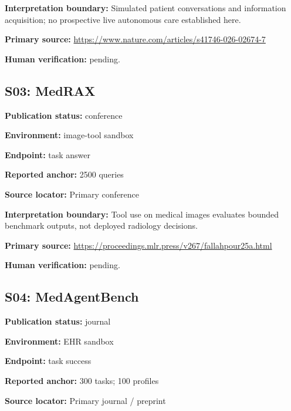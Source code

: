 \documentclass[journal,onecolumn,10pt]{IEEEtran}
\begin{document}
\noindent\textbf{Interpretation boundary:} Simulated patient conversations and information acquisition; no prospective live autonomous care established here.\par

\noindent\textbf{Primary source:} \url{https://www.nature.com/articles/s41746-026-02674-7}\par
\noindent\textbf{Human verification:} pending.

\subsection*{S03: MedRAX}

\noindent\textbf{Publication status:} conference\par

\noindent\textbf{Environment:} image-tool sandbox\par

\noindent\textbf{Endpoint:} task answer\par

\noindent\textbf{Reported anchor:} 2500 queries\par

\noindent\textbf{Source locator:} Primary conference\par

\noindent\textbf{Interpretation boundary:} Tool use on medical images evaluates bounded benchmark outputs, not deployed radiology decisions.\par

\noindent\textbf{Primary source:} \url{https://proceedings.mlr.press/v267/fallahpour25a.html}\par
\noindent\textbf{Human verification:} pending.

\subsection*{S04: MedAgentBench}

\noindent\textbf{Publication status:} journal\par

\noindent\textbf{Environment:} EHR sandbox\par

\noindent\textbf{Endpoint:} task success\par

\noindent\textbf{Reported anchor:} 300 tasks; 100 profiles\par

\noindent\textbf{Source locator:} Primary journal / preprint\par
\end{document}
